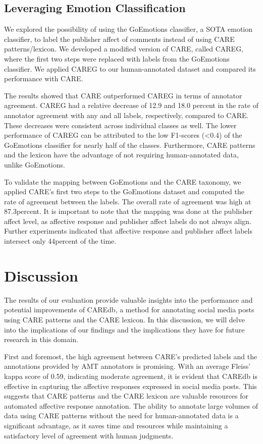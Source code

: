 \documentclass[conference]{IEEEtran}
\begin{document}
\subsection{Leveraging Emotion Classification}
We explored the possibility of using the GoEmotions classifier, a SOTA emotion classifier, to label the publisher affect of comments instead of using CARE patterns/lexicon. We developed a modified version of CARE, called CAREG, where the first two steps were replaced with labels from the GoEmotions classifier. We applied CAREG to our human-annotated dataset and compared its performance with CARE.

The results showed that CARE outperformed CAREG in terms of annotator agreement. CAREG had a relative decrease of 12.9 and 18.0 percent in the rate of annotator agreement with any and all labels, respectively, compared to CARE. These decreases were consistent across individual classes as well. The lower performance of CAREG can be attributed to the low F1-scores (<0.4) of the GoEmotions classifier for nearly half of the classes. Furthermore, CARE patterns and the lexicon have the advantage of not requiring human-annotated data, unlike GoEmotions.

To validate the mapping between GoEmotions and the CARE taxonomy, we applied CARE's first two steps to the GoEmotions dataset and computed the rate of agreement between the labels. The overall rate of agreement was high at 87.3percent. It is important to note that the mapping was done at the publisher affect level, as affective response and publisher affect labels do not always align. Further experiments indicated that affective response and publisher affect labels intersect only 44percent of the time.

\section{Discussion}
The results of our evaluation provide valuable insights into the performance and potential improvements of CAREdb, a method for annotating social media posts using CARE patterns and the CARE lexicon. In this discussion, we will delve into the implications of our findings and the implications they have for future research in this domain.

First and foremost, the high agreement between CARE's predicted labels and the annotations provided by AMT annotators is promising. With an average Fleiss' kappa score of 0.59, indicating moderate agreement, it is evident that CAREdb is effective in capturing the affective responses expressed in social media posts. This suggests that CARE patterns and the CARE lexicon are valuable resources for automated affective response annotation. The ability to annotate large volumes of data using CARE patterns without the need for human-annotated data is a significant advantage, as it saves time and resources while maintaining a satisfactory level of agreement with human judgments.
\end{document}
